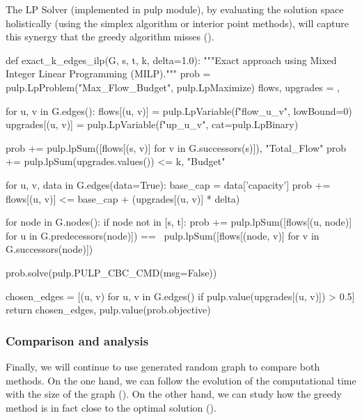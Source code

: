 \documentclass[12pt, openany]{article}
\begin{document}
The LP Solver (implemented in pulp module), by evaluating the solution space holistically (using the simplex algorithm or interior point methods), will capture this synergy that the greedy algorithm misses ().

\begin{python}[caption={Python code for the greedy approach in order to identify the sequence of $k$ edges under budget constraint},  label={lst:3_ilp_method_lst}]
def exact_k_edges_ilp(G, s, t, k, delta=1.0):
    """Exact approach using Mixed Integer Linear Programming (MILP)."""
    prob = pulp.LpProblem("Max_Flow_Budget", pulp.LpMaximize)
    flows, upgrades = {}, {}
    
    for u, v in G.edges():
        flows[(u, v)] = pulp.LpVariable(f"flow_{u}_{v}", lowBound=0)
        upgrades[(u, v)] = pulp.LpVariable(f"up_{u}_{v}", cat=pulp.LpBinary)
        
    prob += pulp.lpSum([flows[(s, v)] for v in G.successors(s)]), "Total_Flow"
    prob += pulp.lpSum(upgrades.values()) <= k, "Budget"
    
    for u, v, data in G.edges(data=True):
        base_cap = data['capacity']
        prob += flows[(u, v)] <= base_cap + (upgrades[(u, v)] * delta)
        
    for node in G.nodes():
        if node not in [s, t]:
            prob += pulp.lpSum([flows[(u, node)] for u in G.predecessors(node)]) == \
                    pulp.lpSum([flows[(node, v)] for v in G.successors(node)])
            
    prob.solve(pulp.PULP_CBC_CMD(msg=False))
    
    chosen_edges = [(u, v) for u, v in G.edges() if pulp.value(upgrades[(u, v)]) > 0.5]
    return chosen_edges, pulp.value(prob.objective)
\end{python}

\subsubsection{Comparison and analysis}

Finally, we will continue to use generated random graph to compare both methods. On the one hand, we can follow the evolution of the computational time with the size of the graph (). On the other hand, we can study how the greedy method is in fact close to the optimal solution ().
\end{document}
